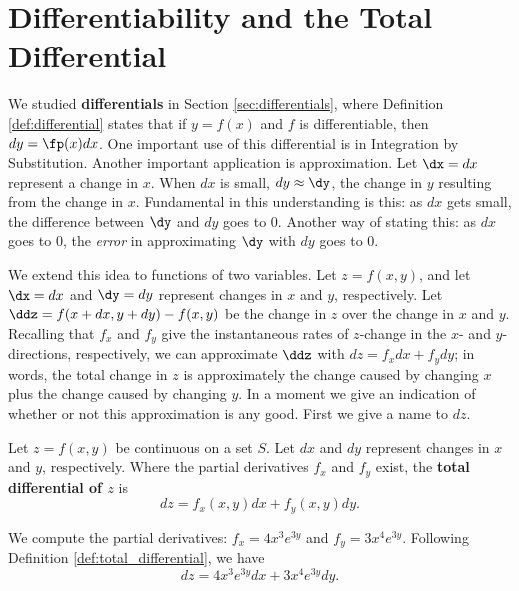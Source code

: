 \section{Differentiability and the Total Differential}\label{sec:total_differential}

We studied  \textbf{differentials} in Section \ref{sec:differentials}, where Definition \ref{def:differential}  states that if $y=f(x)$ and $f$ is differentiable, then $dy=\fp(x)dx$. One important use of this differential is in Integration by Substitution. Another important application is approximation. Let $\dx = dx$ represent a change in $x$. When $dx$ is small, $dy\approx \dy$, the change in $y$ resulting from the change in $x$. Fundamental in this understanding is this: as $dx$ gets small, the difference between $\dy$ and $dy$ goes to 0. Another way of stating this: as $dx$ goes to 0, the \textit{error} in approximating $\dy$ with $dy$ goes to 0.

We extend this idea to functions of two variables. Let $z=f(x,y)$, and let $\dx = dx$ and $\dy=dy$ represent changes in $x$ and $y$, respectively. Let $\ddz = f(x+dx,y+dy) - f(x,y)$ be the change in $z$ over the change in $x$ and $y$. Recalling that $f_x$ and $f_y$ give the instantaneous rates of $z$-change in the $x$- and $y$-directions, respectively, we can approximate $\ddz$ with $dz = f_xdx+f_ydy$; in words, the total change in $z$ is approximately the change caused by changing $x$ plus the change caused by changing $y$. In a moment we give an indication of whether or not this approximation is any good. First we give a name to $dz$.

{Let $z=f(x,y)$ be continuous on a set $S$. Let $dx$ and $dy$ represent changes in $x$ and $y$, respectively. Where the partial derivatives $f_x$ and $f_y$ exist, the \textbf{total differential of $z$} is 
$$dz = f_x(x,y)dx + f_y(x,y)dy.$$
}

{We compute the partial derivatives: $f_x = 4x^3e^{3y}$ and $f_y = 3x^4e^{3y}$. Following Definition \ref{def:total_differential}, we have
$$dz = 4x^3e^{3y}dx+3x^4e^{3y}dy.$$
\baselineskip
}\\

